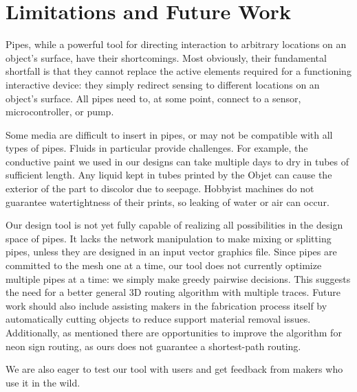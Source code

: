 \section{Limitations and Future Work}
Pipes, while a powerful tool for directing interaction to arbitrary locations on an object's surface, have their shortcomings.  Most obviously, their fundamental shortfall is that they cannot replace the active elements required for a functioning interactive device: they simply redirect sensing to different locations on an object's surface.  All pipes need to, at some point, connect to a sensor, microcontroller, or pump.

Some media are difficult to insert in pipes, or may not be compatible with all types of pipes.  Fluids in particular provide challenges.  For example, the conductive paint we used in our designs can take multiple days to dry in tubes of sufficient length.  Any liquid kept in tubes printed by the Objet can cause the exterior of the part to discolor due to seepage.  Hobbyist machines do not guarantee watertightness of their prints, so leaking of water or air can occur.

Our design tool is not yet fully capable of realizing all possibilities in the design space of pipes.  It lacks the network manipulation to make mixing or splitting pipes, unless they are designed in an input vector graphics file.  Since pipes are committed to the mesh one at a time, our tool does not currently optimize multiple pipes at a time: we simply make greedy pairwise decisions.  This suggests the need for a better general 3D routing algorithm with multiple traces.  Future work should also include assisting makers in the fabrication process itself by automatically cutting objects to reduce support material removal issues.  Additionally, as mentioned there are opportunities to improve the algorithm for neon sign routing, as ours does not guarantee a shortest-path routing.

We are also eager to test our tool with users and get feedback from makers who use it in the wild.